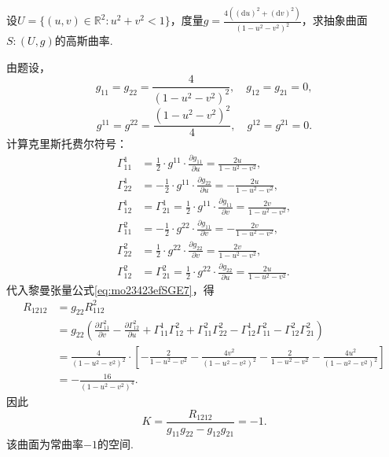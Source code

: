 \documentclass[../../main.tex]{subfiles}%
\begin{document}
\begin{example}
设$U=\{(u,v)\in\mathbb{R}^2:u^2+v^2<1\}$，度量$g=\frac{4\left((\mathrm{d}u)^2+(\mathrm{d}v)^2\right)}{\left(1-u^2-v^2\right)^2}$，求抽象曲面$S:(U,g)$的高斯曲率.
\end{example}
\begin{solution}

由题设，
$$g_{11}=g_{22}=\frac{4}{\left(1-u^2-v^2\right)^2},\quad g_{12}=g_{21}=0,$$
$$g^{11}=g^{22}=\frac{\left(1-u^2-v^2\right)^2}{4},\quad g^{12}=g^{21}=0.$$
计算克里斯托费尔符号：
\begin{align*}
\Gamma^1_{11}&=\frac12\cdot g^{11}\cdot\frac{\partial g_{11}}{\partial u}=\frac{2u}{1-u^2-v^2},\\
\Gamma^1_{22}&=-\frac12\cdot g^{11}\cdot\frac{\partial g_{22}}{\partial u}=-\frac{2u}{1-u^2-v^2},\\
\Gamma^1_{12}&=\Gamma^1_{21}=\frac12\cdot g^{11}\cdot\frac{\partial g_{11}}{\partial v}=\frac{2v}{1-u^2-v^2},\\
\Gamma^2_{11}&=-\frac12\cdot g^{22}\cdot\frac{\partial g_{11}}{\partial v}=-\frac{2v}{1-u^2-v^2},\\
\Gamma^2_{22}&=\frac12\cdot g^{22}\cdot\frac{\partial g_{22}}{\partial v}=\frac{2v}{1-u^2-v^2},\\
\Gamma^2_{12}&=\Gamma^2_{21}=\frac12\cdot g^{22}\cdot\frac{\partial g_{22}}{\partial u}=\frac{2u}{1-u^2-v^2}.
\end{align*}
代入黎曼张量公式\eqref{eq:mo23423efSGE7}，得
\begin{align*}
R_{1212}&=g_{22}R^2_{112}\\
&=g_{22}\left(\frac{\partial\Gamma^2_{11}}{\partial v}-\frac{\partial\Gamma^2_{12}}{\partial u}+\Gamma^1_{11}\Gamma^2_{12}+\Gamma^2_{11}\Gamma^2_{22}-\Gamma^1_{12}\Gamma^2_{11}-\Gamma^2_{12}\Gamma^2_{21}\right)\\
&=\frac{4}{\left(1-u^2-v^2\right)^2}\cdot\left[-\frac{2}{1-u^2-v^2}-\frac{4v^2}{\left(1-u^2-v^2\right)^2}-\frac{2}{1-u^2-v^2}-\frac{4u^2}{\left(1-u^2-v^2\right)^2}\right]\\
&=-\frac{16}{\left(1-u^2-v^2\right)^4}.
\end{align*}
因此
$$K=\frac{R_{1212}}{g_{11}g_{22}-g_{12}g_{21}}=-1.$$
该曲面为常曲率$-1$的空间.

\end{solution}
\end{document}
